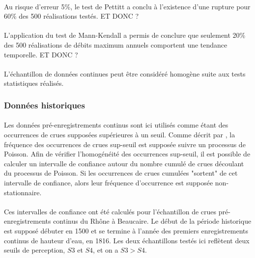 \documentclass[11pt]{article}
\begin{document}
	\paragraph{} Au risque d'erreur 5\%, le test de Pettitt a conclu à l'existence d'une rupture pour 60\% des 500 réalisations testés. ET DONC ?
	
	\paragraph{} L'application du test de Mann-Kendall a permis de conclure que seulement 20\% des 500 réalisations de débits maximum annuels comportent une tendance temporelle. ET DONC ?
	
	\paragraph{} L'échantillon de données continues peut être considéré homogène suite aux tests statistiques réalisés. 
	
		
	\subsubsection{Données historiques}
	
	\paragraph{} Les données pré-enregistrements continus sont ici utilisés comme étant des occurrences de crues supposées supérieures à un seuil. Comme décrit par \citet{lang_towards_1999}, la fréquence des occurrences de crues sup-seuil est supposée suivre un processus de Poisson. Afin de vérifier l'homogénéité des occurrences sup-seuil, il est possible de calculer un intervalle de confiance autour du nombre cumulé de crues découlant du processus de Poisson. Si les occurrences de crues cumulées "sortent" de cet intervalle de confiance, alors leur fréquence d'occurrence est supposée non-stationnaire. 
	
	\paragraph{} Ces intervalles de confiance ont été calculés pour l'échantillon de crues pré-enregistrements continus du Rhône à Beaucaire. Le début de la période historique est supposé débuter en 1500 et se termine à l'année des premiers enregistrements continus de hauteur d'eau, en 1816. Les deux échantillons testés ici reflètent deux seuils de perception, $S3$ et $S4$, et on a $S3 > S4$. 
\end{document}
